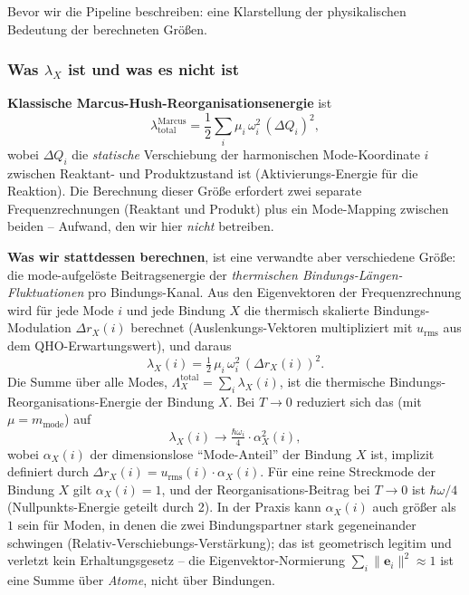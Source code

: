 \documentclass[11pt,a4paper,twoside]{article}
\newcommand{\evec}{\mathbf{e}}
\theoremstyle{remark}
\begin{document}
Bevor wir die Pipeline beschreiben: eine Klarstellung der
physikalischen Bedeutung der berechneten Gr\"o{\ss}en.

\subsubsection*{Was $\lambda_X$ ist und was es nicht ist}

\textbf{Klassische Marcus-Hush-Reorganisationsenergie}
\cite{Marcus1956,Marcus1993} ist
\begin{equation}
  \lambda^{\text{Marcus}}_\text{total}
  = \frac{1}{2}\sum_i \mu_i\,\omega_i^2\,(\Delta Q_i)^2,
  \label{eq:marcus-hush}
\end{equation}
wobei $\Delta Q_i$ die \emph{statische} Verschiebung der harmonischen
Mode-Koordinate $i$ zwischen Reaktant- und Produktzustand ist
(Aktivierungs-Energie f\"ur die Reaktion). Die Berechnung dieser Gr\"o{\ss}e
erfordert zwei separate Frequenzrechnungen (Reaktant und Produkt) plus
ein Mode-Mapping zwischen beiden -- Aufwand, den wir hier
\emph{nicht} betreiben.

\textbf{Was wir stattdessen berechnen}, ist eine verwandte aber
verschiedene Gr\"o{\ss}e: die mode-aufgel\"oste Beitragsenergie der
\emph{thermischen Bindungs-L\"angen-Fluktuationen} pro Bindungs-Kanal.
Aus den Eigenvektoren der Frequenzrechnung wird f\"ur jede Mode $i$
und jede Bindung $X$ die thermisch skalierte Bindungs-Modulation
$\Delta r_X(i)$ berechnet (Auslenkungs-Vektoren multipliziert mit
$u_\text{rms}$ aus dem QHO-Erwartungswert), und daraus
\begin{equation}
  \lambda_X(i) = \tfrac{1}{2}\,\mu_i\,\omega_i^2\,(\Delta r_X(i))^2.
  \label{eq:lambda-mode}
\end{equation}
Die Summe \"uber alle Modes,
$\Lambda_X^\text{total} = \sum_i \lambda_X(i)$, ist die thermische
Bindungs-Reorganisations-Energie der Bindung $X$. Bei $T \to 0$
reduziert sich das (mit $\mu = m_\text{mode}$) auf
\begin{equation}
  \lambda_X(i) \to \tfrac{\hbar\omega_i}{4} \cdot \alpha_X^2(i),
\end{equation}
wobei $\alpha_X(i)$ der dimensionslose ``Mode-Anteil'' der Bindung $X$
ist, implizit definiert durch
$\Delta r_X(i) = u_\text{rms}(i) \cdot \alpha_X(i)$. F\"ur eine reine
Streckmode der Bindung $X$ gilt $\alpha_X(i) = 1$, und der
Reorganisations-Beitrag bei $T \to 0$ ist $\hbar\omega/4$
(Nullpunkts-Energie geteilt durch 2). In der Praxis kann $\alpha_X(i)$
auch gr\"o\ss er als $1$ sein f\"ur Moden, in denen die zwei
Bindungspartner stark gegeneinander schwingen
(Relativ-Verschiebungs-Verst\"arkung); das ist geometrisch legitim
und verletzt kein Erhaltungsgesetz -- die Eigenvektor-Normierung
$\sum_i \lVert\evec_i\rVert^2 \approx 1$ ist eine Summe \"uber
\emph{Atome}, nicht \"uber Bindungen.
\end{document}
